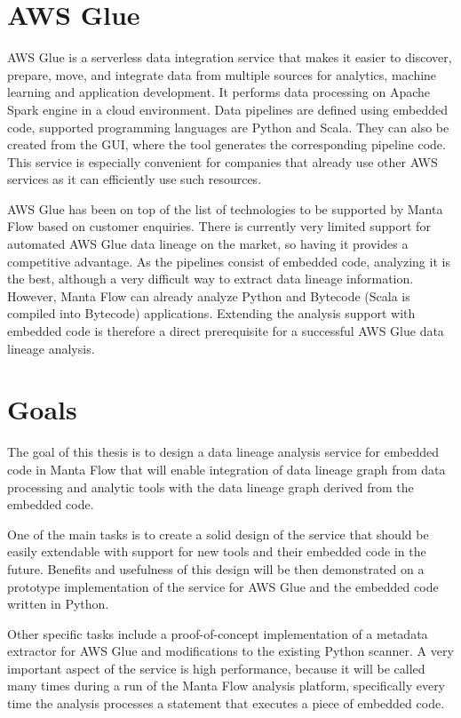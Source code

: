 \section{AWS Glue}

AWS Glue is a serverless data integration service that makes it easier to discover, prepare, move, and integrate data from multiple sources for analytics, machine learning and application development. It performs data processing on Apache Spark engine in a cloud environment. Data pipelines are defined using embedded code, supported programming languages are Python and Scala. They can also be created from the GUI, where the tool generates the corresponding pipeline code. This service is especially convenient for companies that already use other AWS services as it can efficiently use such resources.
\par
AWS Glue has been on top of the list of technologies to be supported by Manta Flow based on customer enquiries. There is currently very limited support for automated AWS Glue data lineage on the market, so having it provides a competitive advantage. As the pipelines consist of embedded code, analyzing it is the best, although a very difficult way to extract data lineage information. However, Manta Flow can already analyze Python and Bytecode (Scala is compiled into Bytecode) applications. Extending the analysis support with embedded code is therefore a direct prerequisite for a successful AWS Glue data lineage analysis.

\section{Goals}

The goal of this thesis is to design a data lineage analysis service for embedded code in Manta Flow that will enable integration of data lineage graph from data processing and analytic tools with the data lineage graph derived from the embedded code.
\par
One of the main tasks is to create a solid design of the service that should be easily extendable with support for new tools and their embedded code in the future. Benefits and usefulness of this design will be then demonstrated on a prototype implementation of the service for AWS Glue and the embedded code written in Python.
\par
Other specific tasks include a proof-of-concept implementation of a metadata extractor for AWS Glue and modifications to the existing Python scanner. A very important aspect of the service is high performance, because it will be called many times during a run of the Manta Flow analysis platform, specifically every time the analysis processes a statement that executes a piece of embedded code.

